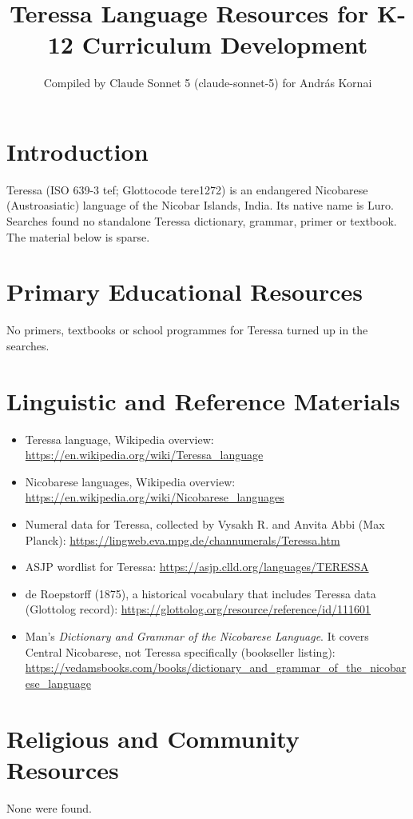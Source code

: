 \documentclass[12pt]{article}
\title{Teressa Language Resources for K-12 Curriculum Development}
\author{Compiled by Claude Sonnet 5 (claude-sonnet-5) for Andr\'as Kornai}
\date{}
\begin{document}
\maketitle

\section{Introduction}
Teressa (ISO 639-3 tef; Glottocode tere1272) is an endangered Nicobarese (Austroasiatic) language of the Nicobar Islands, India. Its native name is Luro. Searches found no standalone Teressa dictionary, grammar, primer or textbook. The material below is sparse.

\section{Primary Educational Resources}
No primers, textbooks or school programmes for Teressa turned up in the searches.

\section{Linguistic and Reference Materials}
\begin{itemize}
\item Teressa language, Wikipedia overview: \url{https://en.wikipedia.org/wiki/Teressa_language}
\item Nicobarese languages, Wikipedia overview: \url{https://en.wikipedia.org/wiki/Nicobarese_languages}
\item Numeral data for Teressa, collected by Vysakh R. and Anvita Abbi (Max Planck): \url{https://lingweb.eva.mpg.de/channumerals/Teressa.htm}
\item ASJP wordlist for Teressa: \url{https://asjp.clld.org/languages/TERESSA}
\item de Roepstorff (1875), a historical vocabulary that includes Teressa data (Glottolog record): \url{https://glottolog.org/resource/reference/id/111601}
\item Man's \emph{Dictionary and Grammar of the Nicobarese Language}. It covers Central Nicobarese, not Teressa specifically (bookseller listing): \url{https://vedamsbooks.com/books/dictionary_and_grammar_of_the_nicobarese_language}
\end{itemize}

\section{Religious and Community Resources}
None were found.
\end{document}
